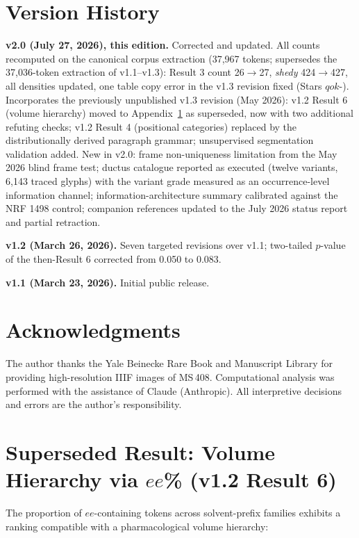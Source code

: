 \documentclass[11pt,a4paper]{article}
\begin{document}
\section*{Version History}

\textbf{v2.0 (July 27, 2026), this edition.} Corrected and updated. All counts recomputed on the canonical corpus extraction (37{,}967 tokens; supersedes the 37{,}036-token extraction of v1.1--v1.3): Result 3 count 26$\to$27, \textit{shedy} 424$\to$427, all densities updated, one table copy error in the v1.3 revision fixed (Stars $qok$-). Incorporates the previously unpublished v1.3 revision (May 2026): v1.2 Result 6 (volume hierarchy) moved to Appendix~\ref{app:r6} as superseded, now with two additional refuting checks; v1.2 Result 4 (positional categories) replaced by the distributionally derived paragraph grammar; unsupervised segmentation validation added. New in v2.0: frame non-uniqueness limitation from the May 2026 blind frame test; ductus catalogue reported as executed (twelve variants, 6{,}143 traced glyphs) with the variant grade measured as an occurrence-level information channel; information-architecture summary calibrated against the NRF 1498 control; companion references updated to the July 2026 status report and partial retraction.

\textbf{v1.2 (March 26, 2026).} Seven targeted revisions over v1.1; two-tailed $p$-value of the then-Result 6 corrected from 0.050 to 0.083.

\textbf{v1.1 (March 23, 2026).} Initial public release.

\section*{Acknowledgments}

The author thanks the Yale Beinecke Rare Book and Manuscript Library for providing high-resolution IIIF images of MS\,408. Computational analysis was performed with the assistance of Claude (Anthropic). All interpretive decisions and errors are the author's responsibility.

\appendix

\section{Superseded Result: Volume Hierarchy via $ee$\% (v1.2 Result 6)}\label{app:r6}

The proportion of $ee$-containing tokens across solvent-prefix families exhibits a ranking compatible with a pharmacological volume hierarchy:
\end{document}
